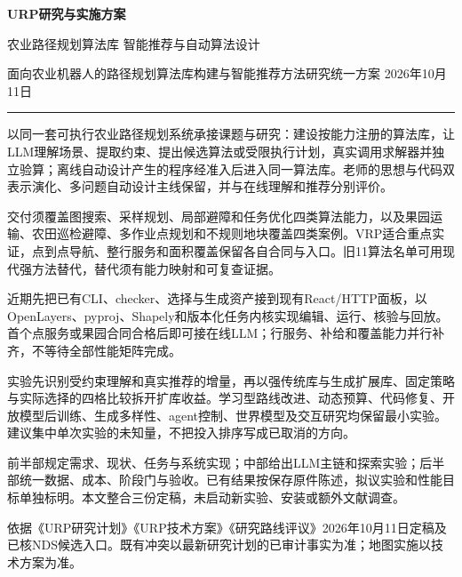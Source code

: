 \documentclass[11pt,a4paper]{article}
\newcommand{\bodytext}[1]{#1\par}
\newcommand{\sourcetext}[1]{{\fontsize{9.2}{14}\selectfont\color{Muted}#1\par}}
\begin{document}
\thispagestyle{empty}

{\sffamily\bfseries\fontsize{27}{36}\selectfont URP研究与实施方案\par}\vspace{9pt}
{\sffamily\fontsize{14}{22}\selectfont 农业路径规划算法库 智能推荐与自动算法设计\par}\vspace{8pt}
{\fontsize{10}{15}\selectfont\color{Muted}面向农业机器人的路径规划算法库构建与智能推荐方法研究\newline 统一方案  2026年10月11日\par}\vspace{14pt}\hrule\vspace{12pt}
\vspace{2pt}
\bodytext{以同一套可执行农业路径规划系统承接课题与研究：建设按能力注册的算法库，让LLM理解场景、提取约束、提出候选算法或受限执行计划，真实调用求解器并独立验算；离线自动设计产生的程序经准入后进入同一算法库。老师的思想与代码双表示演化、多问题自动设计主线保留，并与在线理解和推荐分别评价。}
\bodytext{交付须覆盖图搜索、采样规划、局部避障和任务优化四类算法能力，以及果园运输、农田巡检避障、多作业点规划和不规则地块覆盖四类案例。VRP适合重点实证，点到点导航、整行服务和面积覆盖保留各自合同与入口。旧11算法名单可用现代强方法替代，替代须有能力映射和可复查证据。}
\vspace{2pt}
\bodytext{近期先把已有CLI、checker、选择与生成资产接到现有React/\allowbreak{}HTTP面板，以OpenLayers、pyproj、Shapely和版本化任务内核实现编辑、运行、核验与回放。首个点服务或果园合同合格后即可接在线LLM；行服务、补给和覆盖能力并行补齐，不等待全部性能矩阵完成。}
\bodytext{实验先识别受约束理解和真实推荐的增量，再以强传统库与生成扩展库、固定策略与实际选择的四格比较拆开扩库收益。学习型路线改进、动态预算、代码修复、开放模型后训练、生成多样性、agent控制、世界模型及交互研究均保留最小实验。建议集中单次实验的未知量，不把投入排序写成已取消的方向。}
\vspace{2pt}
\bodytext{前半部规定需求、现状、任务与系统实现；中部给出LLM主链和探索实验；后半部统一数据、成本、阶段门与验收。已有结果按保存原件陈述，拟议实验和性能目标单独标明。本文整合三份定稿，未启动新实验、安装或额外文献调查。}
\sourcetext{依据《URP研究计划》《URP技术方案》《研究路线评议》2026年10月11日定稿及已核NDS候选入口。既有冲突以最新研究计划的已审计事实为准；地图实施以技术方案为准。}
\clearpage
\tableofcontents
\clearpage
{}
\end{document}
